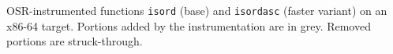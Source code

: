 \label{fig:isordx86-64} OSR-instrumented functions {\tt isord} (base) and {\tt isordasc} (faster variant) on an x86-64 target. Portions added by the instrumentation are in grey. Removed portions are struck-through.
